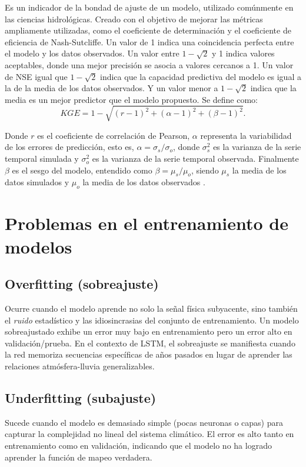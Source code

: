 Es un indicador de la bondad de ajuste de un modelo, utilizado comúnmente en las ciencias hidrológicas. Creado con el objetivo de mejorar las métricas ampliamente utilizadas, como el coeficiente de determinación y el coeficiente de eficiencia de Nash-Sutcliffe. Un valor de 1 indica una coincidencia perfecta entre el modelo y los datos observados. Un valor entre $1-\sqrt{2}$ y 1 indica valores aceptables, donde una mejor precisión se asocia a valores cercanos a 1. Un valor de NSE igual que $1-\sqrt{2}$ indica que la capacidad predictiva del modelo es igual a la de la media de los datos observados. Y un valor menor a $1-\sqrt{2}$ indica que la media es un mejor predictor que el modelo propuesto. Se define como:
\begin{equation}
    KGE = 1 -\sqrt{(r-1)^2+(\alpha-1)^2+(\beta-1)^2}.
\end{equation}

Donde $r$ es el coeficiente de correlación de Pearson, $\alpha$ representa la variabilidad de los errores de predicción, esto es, $\alpha=\sigma_s/\sigma_o$, donde $\sigma_s^2$ es la varianza de la serie temporal simulada y $\sigma_o^2$ es la varianza de la serie temporal observada. Finalmente $\beta$ es el sesgo del modelo, entendido como $\beta=\mu_s/\mu_o$, siendo $\mu_s$ la media de los datos simulados y $\mu_o$ la media de los datos observados \citep{Kling-Gupta}.

\section{Problemas en el entrenamiento de modelos}

\subsection{Overfitting (sobreajuste)}
Ocurre cuando el modelo aprende no solo la señal física subyacente, sino también el \textit{ruido} estadístico y las idiosincrasias del conjunto de entrenamiento. Un modelo sobreajustado exhibe un error muy bajo en entrenamiento pero un error alto en validación/prueba. En el contexto de LSTM, el sobreajuste se manifiesta cuando la red memoriza secuencias específicas de años pasados en lugar de aprender las relaciones atmósfera-lluvia generalizables.

\subsection{Underfitting (subajuste)}
Sucede cuando el modelo es demasiado simple (pocas neuronas o capas) para capturar la complejidad no lineal del sistema climático. El error es alto tanto en entrenamiento como en validación, indicando que el modelo no ha logrado aprender la función de mapeo verdadera.

